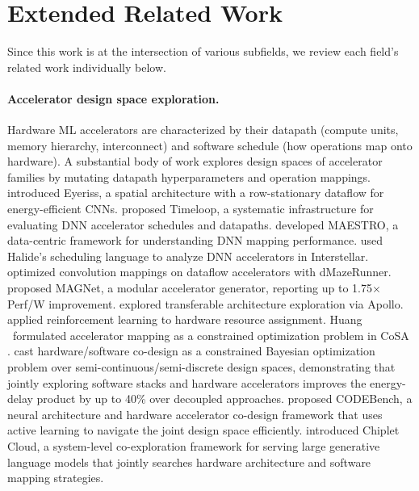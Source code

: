 \section{Extended Related Work}\label{related_work_appendix}
Since this work is at the intersection of various subfields, we review each field's related work individually below.
\paragraph{Accelerator design space exploration.}
Hardware ML accelerators are characterized by their datapath (compute units, memory hierarchy, interconnect) and software schedule (how operations map onto hardware).
A substantial body of work explores design spaces of accelerator families by mutating datapath hyperparameters and operation mappings.
\citep{chen2019eyerissv2flexibleaccelerator} introduced Eyeriss, a spatial architecture with a row-stationary dataflow for energy-efficient CNNs.
\citep{timeloop} proposed Timeloop, a systematic infrastructure for evaluating DNN accelerator schedules and datapaths.
\citep{kwon2020understandingreuseperformancehardware} developed MAESTRO, a data-centric framework for understanding DNN mapping performance.
\citep{yang_interstellar} used Halide's scheduling language to analyze DNN accelerators in Interstellar.
\citep{dave2019dmazerunner} optimized convolution mappings on dataflow accelerators with dMazeRunner. 
\citep{venkatesan2019magnet} proposed MAGNet, a modular accelerator generator, reporting up to 1.75$\times$ Perf/W improvement.
\citep{yazdanbakhsh2021apollotransferablearchitectureexploration} explored transferable architecture exploration via Apollo.
\citep{kao2020confuciuxautonomoushardwareresource} applied reinforcement learning to hardware resource assignment.
Huang \etal~formulated accelerator mapping as a constrained optimization problem in CoSA \citep{huang2021cosaschedulingconstrainedoptimization}. 
\citep{shi2020learnedhardwaresoftwarecodesignneural} cast hardware/software co-design as a constrained Bayesian optimization problem over semi-continuous/semi-discrete design spaces, demonstrating that jointly exploring software stacks and hardware accelerators improves the energy-delay product by up to 40\% over decoupled approaches.  
\citep{Tuli_2023} proposed CODEBench, a neural architecture and hardware accelerator co-design framework that uses active learning to navigate the joint design space efficiently. \citep{peng2024chipletcloudbuildingai} introduced Chiplet Cloud, a system-level co-exploration framework for serving large generative language models that jointly searches hardware architecture and software mapping strategies. 
